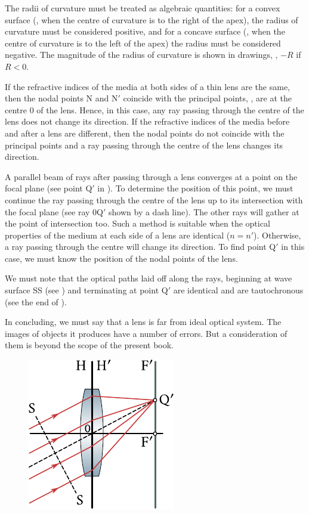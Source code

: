 The radii of curvature must be treated as algebraic quantities: for a convex surface (\ie, when the centre of curvature is to the right of
the apex), the radius of curvature must be considered positive, and for a concave surface (\ie, when the centre of curvature is to the left of the apex) the radius must be considered
negative.
The magnitude of the radius of curvature is shown in drawings, \ie, $-R$ if $R < 0$.

If the refractive indices of the media at both sides of a thin lens are the same, then the nodal points N and N$'$ coincide with the principal points, \ie, are at the centre $0$ of the lens.
Hence, in this case, any ray passing through the centre of the lens does not change its direction.
If the refractive indices of the media before and after a lens are different, then the nodal points do not coincide with the principal points and a ray passing through the centre of the lens changes its direction.

A parallel beam of rays after passing through a lens converges at a point on the focal plane (see point Q$'$ in ).
To determine the position of this point, we must continue the ray passing through the centre of the lens up to its intersection with the focal plane (see ray $0$Q$'$ shown by a dash line).
The other rays will gather at the point of intersection too.
Such a method is suitable when the optical properties of the medium at each side of a lens are identical ($n=n'$).
Otherwise, a ray passing through the centre will change its direction.
To find point Q$'$ in this case, we must know the position of the nodal points of the lens.

We must note that the optical paths laid off along the rays, beginning at wave surface SS (see ) and terminating at point Q$'$
are identical and are tautochronous (see the end of ).

In concluding, we must say that a lens is far from ideal optical system.
The images of objects it produces have a number of errors.
But a consideration of them is beyond the scope of the present book.

\begin{figure}[t]
	\begin{center}
		\includegraphics[scale=1]{figures/ch_16/fig_16_20.pdf}
        \caption[]{}
		\label{fig:16_20}
	\end{center}
	\vspace{-0.8cm}
\end{figure}

